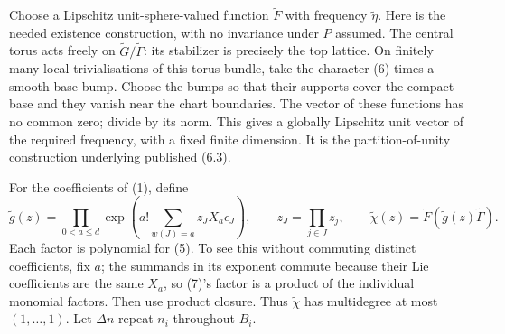 \documentclass[11pt]{article}
\begin{document}
Choose a Lipschitz unit-sphere-valued function $\widetilde F$ with frequency
$\widetilde\eta$. Here is the needed existence construction, with no
invariance under $P$ assumed. The central torus acts freely on
$\widetilde G/\widetilde\Gamma$: its stabilizer is precisely the top
lattice. On finitely many local trivialisations of this torus bundle,
take the character (6) times a smooth base bump. Choose the bumps so
that their supports cover the compact base and they vanish near the
chart boundaries. The vector of these functions has no common zero;
divide by its norm. This gives a globally Lipschitz unit vector of the
required frequency, with a fixed finite dimension. It is the
partition-of-unity construction underlying published (6.3).

For the coefficients of (1), define
\[
 \widetilde g(z)=\prod_{0<a\leq d}
 \exp\left(a!\sum_{w(J)=a}z_J X_a\epsilon_J\right),
 \qquad z_J=\prod_{j\in J}z_j,\qquad
 \widetilde\chi(z)=\widetilde F(\widetilde g(z)\widetilde\Gamma).
                                                        \tag{7}
\]
Each factor is polynomial for (5). To see this without commuting distinct
coefficients, fix $a$; the summands in its exponent commute because their
Lie coefficients are the same $X_a$, so (7)'s factor is a product of the
individual monomial factors. Then use product closure. Thus
$\widetilde\chi$ has multidegree at most $(1,\ldots,1)$.
Let $\Delta n$ repeat $n_i$ throughout $B_i$.
\end{document}
